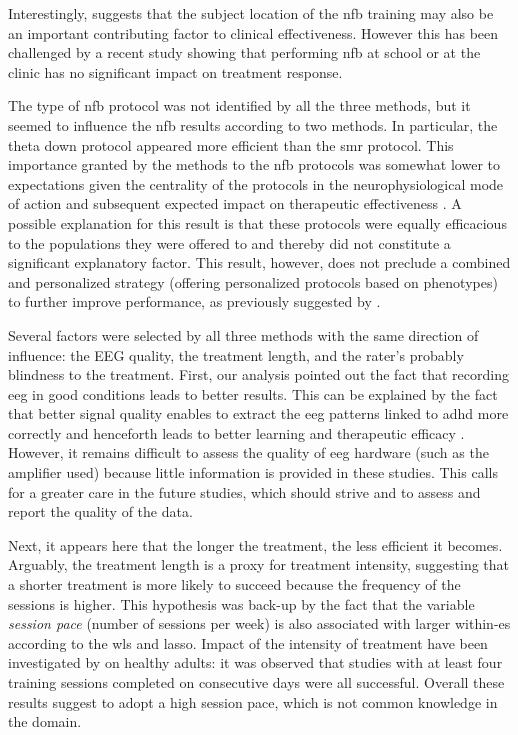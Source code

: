 Interestingly, \citep{Minder2018} suggests that the subject location of the \gls{nfb} training may also be an important contributing 
factor to clinical effectiveness. However this has been challenged by a recent study \citep{Minder2018} showing that 
performing \gls{nfb} at school or at the clinic has no significant impact on treatment response. 

The type of \gls{nfb} protocol was not identified by all the three methods, but it seemed to influence the \gls{nfb} results
according to two methods. In particular, the theta down protocol appeared more efficient than the \gls{smr} protocol. 
This importance granted by the methods to the \gls{nfb} protocols was somewhat lower to
expectations given the centrality of the protocols in the neurophysiological mode of action and subsequent expected impact on
therapeutic effectiveness \citep{Vernon2004}. A possible explanation for this result is that these protocols were equally 
efficacious to the populations they were offered to and thereby did not constitute a significant explanatory factor. 
This result, however, does not preclude a combined and personalized strategy (offering personalized protocols based on phenotypes)
to further improve performance, as previously suggested by \citet{Alkoby2017}.

Several factors were selected by all three methods with the same direction of influence: the EEG quality, the treatment 
length, and the rater's probably blindness to the treatment. First, our analysis pointed out the fact that recording \gls{eeg} 
in good conditions leads to better results.
This can be explained by the fact that better signal quality enables to extract the \gls{eeg} patterns
linked to \gls{adhd} more correctly and henceforth leads to better learning and therapeutic efficacy \citep{Congedo2004}. 
However, it remains difficult to assess the quality of \gls{eeg} hardware (such as the amplifier used) 
because little information is provided in these studies.  
This calls for a greater care in the future studies, which should strive and to assess and report the quality of the data.

Next, it appears here that the longer the treatment, the less efficient it becomes. Arguably, the treatment length is a
proxy for treatment intensity, suggesting that a shorter treatment is more likely to succeed because the frequency of the sessions
is higher. This hypothesis was back-up by the fact that the variable \emph{session pace} (number of
sessions per week) is also associated with larger within-\gls{es} according to the \gls{wls} and \gls{lasso}. Impact of the
intensity of treatment have been investigated by \citep{Rogala2016} on healthy adults: it was observed that studies with
at least four training sessions completed on consecutive days were all successful. Overall these results suggest to adopt a high session pace, 
which is not common knowledge in the domain.

